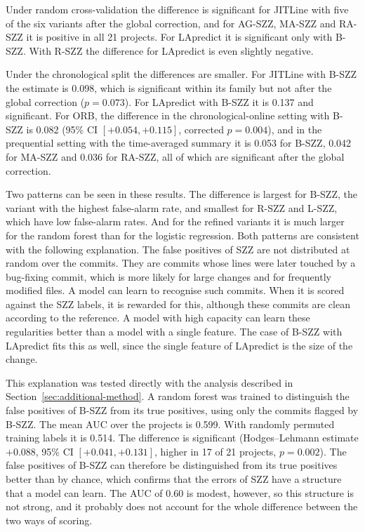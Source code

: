 \documentclass[12pt,a4paper,oneside]{report}
\begin{document}
Under random cross-validation the difference is significant for JITLine with
five of the six variants after the global correction, and for AG-SZZ, MA-SZZ
and RA-SZZ it is positive in all 21 projects. For LApredict it is significant
only with B-SZZ. With R-SZZ the difference for LApredict is even slightly
negative.

Under the chronological split the differences are smaller. For JITLine with
B-SZZ the estimate is 0.098, which is significant within its family but not
after the global correction ($p = 0.073$). For LApredict with B-SZZ it is
0.137 and significant. For ORB, the difference in the chronological-online
setting with B-SZZ is 0.082 (95\% CI $[+0.054, +0.115]$, corrected
$p = 0.004$), and in the prequential setting with the time-averaged summary
it is 0.053 for B-SZZ, 0.042 for MA-SZZ and 0.036 for RA-SZZ, all of which
are significant after the global correction.

Two patterns can be seen in these results. The difference is largest for
B-SZZ, the variant with the highest false-alarm rate, and smallest for R-SZZ
and L-SZZ, which have low false-alarm rates. And for the refined variants it
is much larger for the random forest than for the logistic regression. Both
patterns are consistent with the following explanation. The false positives
of SZZ are not distributed at random over the commits. They are commits whose
lines were later touched by a bug-fixing commit, which is more likely for
large changes and for frequently modified files. A model can learn to
recognise such commits. When it is scored against the SZZ labels, it is
rewarded for this, although these commits are clean according to the
reference. A model with high capacity can learn these regularities better
than a model with a single feature. The case of B-SZZ with LApredict fits
this as well, since the single feature of LApredict is the size of the
change.

This explanation was tested directly with the analysis described in
Section~\ref{sec:additional-method}. A random forest was trained to
distinguish the false positives of B-SZZ from its true positives, using only
the commits flagged by B-SZZ. The mean AUC over the projects is 0.599. With
randomly permuted training labels it is 0.514. The difference is significant
(Hodges--Lehmann estimate $+0.088$, 95\% CI $[+0.041, +0.131]$, higher in 17
of 21 projects, $p = 0.002$). The false positives of B-SZZ can therefore be
distinguished from its true positives better than by chance, which confirms
that the errors of SZZ have a structure that a model can learn. The AUC of
0.60 is modest, however, so this structure is not strong, and it probably
does not account for the whole difference between the two ways of scoring.
\end{document}
